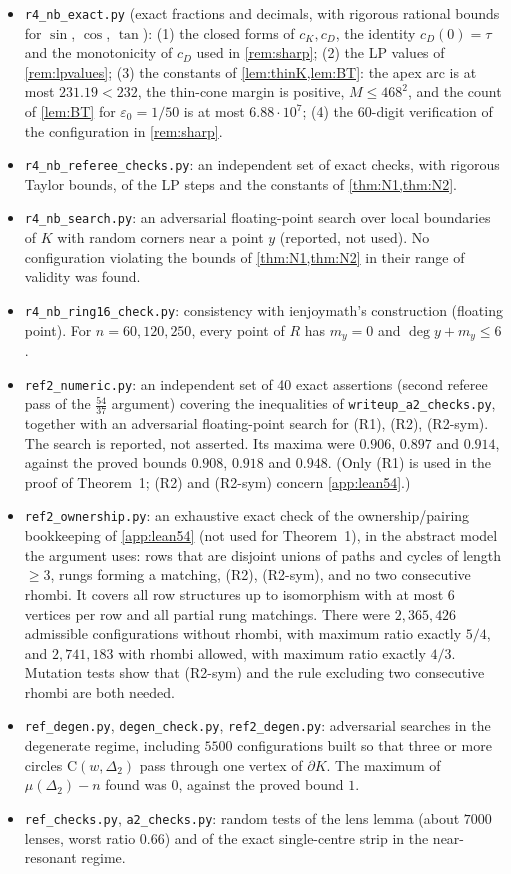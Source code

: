 \documentclass[11pt]{amsart}
\theoremstyle{definition}
\theoremstyle{remark}
\newcommand{\Dt}{\Delta_2}
\newcommand{\mult}{\mu}
\newcommand{\eps}{\varepsilon}
\newcommand{\Cc}{\mathrm{C}}      %
\begin{document}
\begin{itemize}[leftmargin=2em]
\item \texttt{r4\_nb\_exact.py} (exact fractions and decimals, with rigorous rational bounds for $\sin$, $\cos$, $\tan$): (1) the closed forms of $c_K,c_D$, the identity $c_D(0)=\tau$ and the monotonicity of $c_D$ used in \cref{rem:sharp}; (2) the LP values of \cref{rem:lpvalues}; (3) the constants of \cref{lem:thinK,lem:BT}: the apex arc is at most $231.19<232$, the thin-cone margin is positive, $M\le468^2$, and the count of \cref{lem:BT} for $\eps_0=1/50$ is at most $6.88\cdot10^7$; (4) the $60$-digit verification of the configuration in \cref{rem:sharp}.
\item \texttt{r4\_nb\_referee\_checks.py}: an independent set of exact checks, with rigorous Taylor bounds, of the LP steps and the constants of \cref{thm:N1,thm:N2}.
\item \texttt{r4\_nb\_search.py}: an adversarial floating-point search over local boundaries of $K$ with random corners near a point $y$ (reported, not used). No configuration violating the bounds of \cref{thm:N1,thm:N2} in their range of validity was found.
\item \texttt{r4\_nb\_ring16\_check.py}: consistency with ienjoymath's construction (floating point). For $n=60,120,250$, every point of $R$ has $m_y=0$ and $\deg y+m_y\le6$.
\item \texttt{ref2\_numeric.py}: an independent set of 40 exact assertions (second referee pass of the $\frac{54}{37}$ argument) covering the inequalities of \texttt{writeup\_a2\_checks.py}, together with an adversarial floating-point search for (R1), (R2), (R2-sym). The search is reported, not asserted. Its maxima were $0.906$, $0.897$ and $0.914$, against the proved bounds $0.908$, $0.918$ and $0.948$. (Only (R1) is used in the proof of Theorem~1; (R2) and (R2-sym) concern \cref{app:lean54}.)
\item \texttt{ref2\_ownership.py}: an exhaustive exact check of the ownership/pairing bookkeeping of \cref{app:lean54} (not used for Theorem~1), in the abstract model the argument uses: rows that are disjoint unions of paths and cycles of length $\ge3$, rungs forming a matching, (R2), (R2-sym), and no two consecutive rhombi. It covers all row structures up to isomorphism with at most $6$ vertices per row and all partial rung matchings. There were $2{,}365{,}426$ admissible configurations without rhombi, with maximum ratio exactly $5/4$, and $2{,}741{,}183$ with rhombi allowed, with maximum ratio exactly $4/3$. Mutation tests show that (R2-sym) and the rule excluding two consecutive rhombi are both needed.
\item \texttt{ref\_degen.py}, \texttt{degen\_check.py}, \texttt{ref2\_degen.py}: adversarial searches in the degenerate regime, including $5500$ configurations built so that three or more circles $\Cc(w,\Dt)$ pass through one vertex of $\partial K$. The maximum of $\mult(\Dt)-n$ found was $0$, against the proved bound $1$.
\item \texttt{ref\_checks.py}, \texttt{a2\_checks.py}: random tests of the lens lemma (about $7000$ lenses, worst ratio $0.66$) and of the exact single-centre strip in the near-resonant regime.
\end{itemize}
\end{document}
